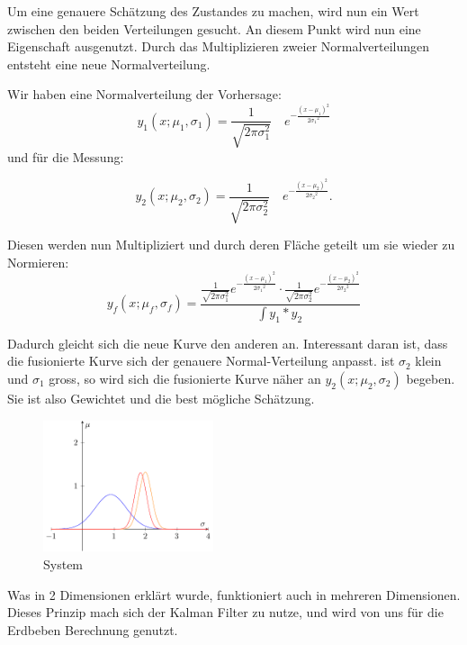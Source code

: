 Um eine genauere Schätzung des Zustandes zu machen, wird nun ein Wert zwischen den beiden Verteilungen gesucht. An diesem Punkt wird nun eine Eigenschaft ausgenutzt. Durch das Multiplizieren zweier Normalverteilungen entsteht eine neue Normalverteilung. 

Wir haben eine Normalverteilung der Vorhersage:
\begin{equation}
{y_1}(x;{\mu_1},{\sigma_1})=\frac{1}{\sqrt{2\pi\sigma_1^2}}\quad e^{-\frac{(x-{\mu_1})^2}{2{\sigma_1}^2}}
\end{equation} 
und für die Messung:

\begin{equation}
{y_2}(x;{\mu_2},{\sigma_2})=\frac{1}{\sqrt{2\pi\sigma_2^2}}\quad e^{-\frac{(x-{\mu_2})^2}{2{\sigma_2}^2}}.
\end{equation} 

Diesen werden nun Multipliziert und durch deren Fläche geteilt um sie wieder zu Normieren:
\begin{equation}
{y_f}(x;{\mu_f},{\sigma_f})=\frac{ \frac{1}{\sqrt{2\pi\sigma_1^2}}e^{-\frac{(x-{\mu_1})^2}{2{\sigma_1}^2}} \cdot \frac{1}{\sqrt{2\pi\sigma_2^2}}e^{-\frac{(x-{\mu_2})^2}{2{\sigma_2}^2}}}{\int {y_1}*{y_2}\,}
\end{equation} 

Dadurch gleicht sich die neue Kurve den anderen an. Interessant daran ist, dass die fusionierte Kurve sich der genauere Normal-Verteilung anpasst. ist ${\sigma_2}$ klein und ${\sigma_1}$ gross, so wird sich die fusionierte Kurve näher an ${y_2}(x;{\mu_2},{\sigma_2})$ begeben. Sie ist also Gewichtet und die best mögliche Schätzung. 


\begin{figure}
 \begin{center}
 \includegraphics[width=5cm]{papers/erdbeben/Gausskurve3.pdf}
 \caption{System}
 \end{center}
\end{figure}

 
Was in 2 Dimensionen erklärt wurde, funktioniert auch in mehreren Dimensionen. Dieses Prinzip mach sich der Kalman Filter zu nutze, und wird von uns für die Erdbeben Berechnung genutzt. 

